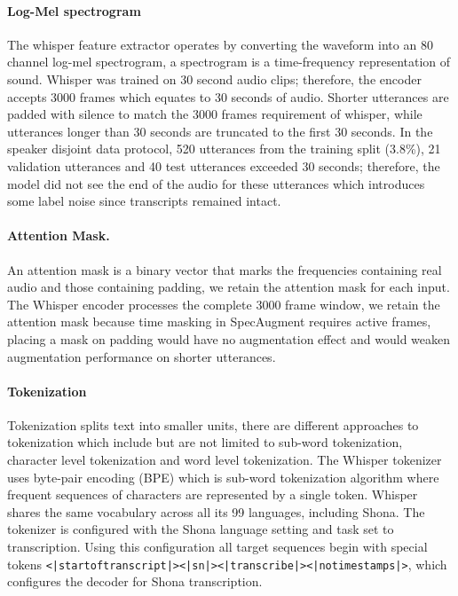 {\paragraph{Log-Mel spectrogram}

The whisper feature extractor operates by converting the waveform into an 80 channel log-mel spectrogram, a spectrogram is a time-frequency representation of sound. Whisper was trained on 30 second audio clips; therefore, the encoder accepts 3000 frames which equates to 30 seconds of audio. Shorter utterances are padded with silence to match the 3000 frames requirement of whisper, while utterances longer than 30 seconds are truncated to the first 30 seconds. In the speaker disjoint data protocol, 520 utterances from the training split (3.8\%), 21 validation utterances and 40 test utterances exceeded 30 seconds; therefore, the model did not see the end of the audio for these utterances which introduces some label noise since transcripts remained intact.

\paragraph{Attention Mask.}
An attention mask is a binary vector that marks the frequencies containing real audio and those containing padding, we retain the attention mask for each input. The Whisper encoder processes the complete 3000 frame window, we retain the attention mask because time masking in SpecAugment requires active frames, placing a mask on padding would have no augmentation effect and would weaken augmentation performance on shorter utterances.

\paragraph{Tokenization}
Tokenization splits text into smaller units, there are different approaches to tokenization which include but are not limited to sub-word tokenization, character level tokenization and word level tokenization. The Whisper tokenizer uses byte-pair encoding (BPE) which is sub-word tokenization algorithm\citep{Sennrich2016, Radford2022} where frequent sequences of characters are represented by a single token. Whisper shares the same vocabulary across all its 99 languages, including Shona. The tokenizer is configured with the Shona language setting and task set to transcription. Using this configuration all target sequences begin with special tokens  \texttt{<|startoftranscript|><|sn|><|transcribe|><|notimestamps|>}, which configures the decoder for Shona transcription.

}
